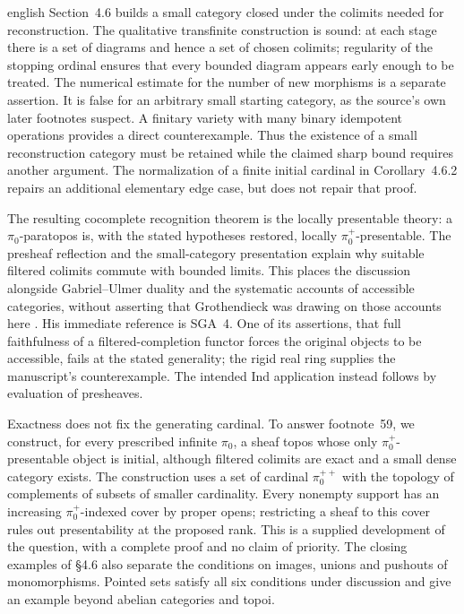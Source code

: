 \begin{otherlanguage*}{english}
Section~4.6 builds a small category closed under the colimits needed for reconstruction. The qualitative transfinite construction is sound: at each stage there is a set of diagrams and hence a set of chosen colimits; regularity of the stopping ordinal ensures that every bounded diagram appears early enough to be treated. The numerical estimate for the number of new morphisms is a separate assertion. It is false for an arbitrary small starting category, as the source's own later footnotes suspect. A finitary variety with many binary idempotent operations provides a direct counterexample. Thus the existence of a small reconstruction category must be retained while the claimed sharp bound requires another argument. The normalization of a finite initial cardinal in Corollary~4.6.2 repairs an additional elementary edge case, but does not repair that proof.

The resulting cocomplete recognition theorem is the locally presentable theory: a $\pi_0$-paratopos is, with the stated hypotheses restored, locally $\pi_0^+$-presentable. The presheaf reflection and the small-category presentation explain why suitable filtered colimits commute with bounded limits. This places the discussion alongside Gabriel--Ulmer duality and the systematic accounts of accessible categories, without asserting that Grothendieck was drawing on those accounts here \citep{GabrielUlmer1971,MakkaiPare1989,AdamekRosicky1994}. His immediate reference is SGA~4. One of its assertions, that full faithfulness of a filtered-completion functor forces the original objects to be accessible, fails at the stated generality; the rigid real ring supplies the manuscript's counterexample. The intended Ind application instead follows by evaluation of presheaves.

Exactness does not fix the generating cardinal. To answer footnote~59, we construct, for every prescribed infinite $\pi_0$, a sheaf topos whose only $\pi_0^+$-presentable object is initial, although filtered colimits are exact and a small dense category exists. The construction uses a set of cardinal $\pi_0^{++}$ with the topology of complements of subsets of smaller cardinality. Every nonempty support has an increasing $\pi_0^+$-indexed cover by proper opens; restricting a sheaf to this cover rules out presentability at the proposed rank. This is a supplied development of the question, with a complete proof and no claim of priority. The closing examples of \S4.6 also separate the conditions on images, unions and pushouts of monomorphisms. Pointed sets satisfy all six conditions under discussion and give an example beyond abelian categories and topoi.


\end{otherlanguage*}
